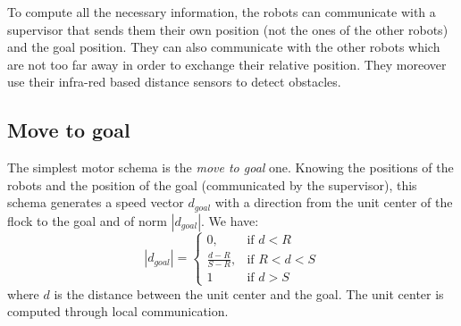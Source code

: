 \documentclass[journal]{IEEEtran}
\begin{document}
To compute all the necessary information, the robots can communicate with a supervisor that sends them their own position (not the ones of the other robots) and the goal position. They can also communicate with the other robots which are not too far away in order to exchange their relative position. They moreover use their infra-red based distance sensors to detect obstacles.

\subsection{Move to goal}  
The simplest motor schema is the \textit{move to goal} one. Knowing the positions of the robots and the position of the goal (communicated by the supervisor), this schema generates a speed vector $d_{goal}$ with a direction from the unit center of the flock to the goal and of norm $|d_{goal}|$. We have:
\begin{equation}
|d_{goal}| = \begin{cases} 0, & \mbox{if }  d<R \\ \frac{d-R}{S-R}, & \mbox{if }
   R<d<S \\ 1 & \mbox{if } d>S\end{cases}
\end{equation}
where $d$ is the distance between the unit center and the goal. The unit center is computed through local communication.
\end{document}
